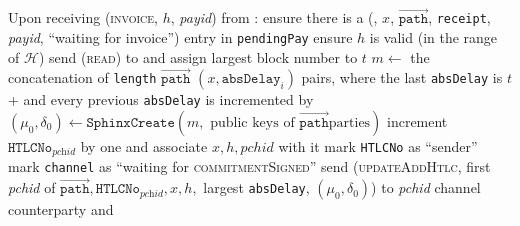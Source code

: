\begin{algorithmic}[1]
    \State Upon receiving (\textsc{invoice}, $h$, \textit{payid}) from \bob:
    \Indent
      \State ensure there is a (\bob, $x$, $\overrightarrow{\mathtt{path}}$,
      \texttt{receipt}, \textit{payid}, ``waiting for invoice'') entry in
      \texttt{pendingPay}
      \State ensure $h$ is valid (in the range of $\mathcal{H}$)
      \State send (\textsc{read}) to \ledger{} and assign largest block number
      to $t$
      \State $m \gets$ the concatenation of \texttt{length}
      $\overrightarrow{\mathtt{path}}$ $\left(x, \mathtt{absDelay}_i\right)$
      pairs, where the last \texttt{absDelay} is $t$ +  and
      every previous \texttt{absDelay} is incremented by 
      \State $\left(\mu_0, \delta_0\right) \gets \mathtt{SphinxCreate}\left(m,
      \text{ public keys of } \overrightarrow{\mathtt{path}} \text{
      parties}\right)$
      \State increment $\mathtt{HTLCNo}_{\textit{pchid}}$ by one and associate
      $x, h, \mathit{pchid}$ with it
      \State mark \texttt{HTLCNo} as ``sender''
      \State mark \texttt{channel} as ``waiting for \textsc{commitmentSigned}''
      \State send (\textsc{updateAddHtlc}, first \textit{pchid} of
      $\overrightarrow{\mathtt{path}}, \mathtt{HTLCNo}_{\textit{pchid}}, x, h,$
      largest \texttt{absDelay}, $\left(\mu_0, \delta_0\right)$) to
      \textit{pchid} channel counterparty and \adversary
    \EndIndent
    \State


\end{algorithmic}
